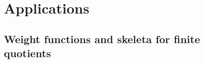 \documentclass{amsart}%
\numberwithin{equation}{subsection}
\theoremstyle{plain2}
\theoremstyle{definition2}
\theoremstyle{stepstyle}
\theoremstyle{point}
\theoremstyle{subpoint}
\newcommand{\Spec}{\ensuremath{\mathrm{Spec}\,}}
\newcommand{\Proj}{\ensuremath{\mathbb{P}}}
\begin{document}
%
%
%
%

\section{Applications}
\subsection{Weight functions and skeleta for finite quotients}
\end{document}
